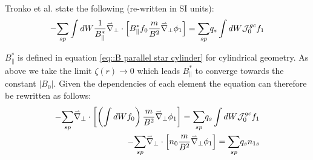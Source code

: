 % 
% 
% 
% 
% 
% 
% 
% 
% 


Tronko et al. \cite{TronkoQuasiNeutrality} state the following (re-written in SI units):
\begin{equation}
 -\underset{sp}{\sum}\int dW \frac{1}{B_\parallel^*}\accentset{\rightharpoonup}{\nabla}_\perp\cdot\left[ B_\parallel^* f_0 \frac{m}{B^2}\accentset{\rightharpoonup}{\nabla}_\perp \phi_1\right] = \underset{sp}{\sum} q_s \int dW \mathcal{J}_0^{gc}f_1
\end{equation}

$B_\parallel^*$ is defined in equation \ref{eq::B parallel star cylinder} for cylindrical geometry. As above we take the limit $\zeta(r)\rightarrow0$ which leads $B_\parallel^*$ to converge towards the constant $|B_0|$. Given the dependencies of each element the equation can therefore be rewritten as follows:
\begin{align}
 -\underset{sp}{\sum} \accentset{\rightharpoonup}{\nabla}_\perp\cdot\left[\left(\int dW f_0\right) \frac{m}{B^2}\accentset{\rightharpoonup}{\nabla}_\perp \phi_1\right] = \underset{sp}{\sum} q_s \int dW \mathcal{J}_0^{gc}f_1\\
 -\underset{sp}{\sum} \accentset{\rightharpoonup}{\nabla}_\perp\cdot\left[n_0 \frac{m}{B^2}\accentset{\rightharpoonup}{\nabla}_\perp \phi_1\right] = \underset{sp}{\sum} q_s n_{1s}
\end{align}

